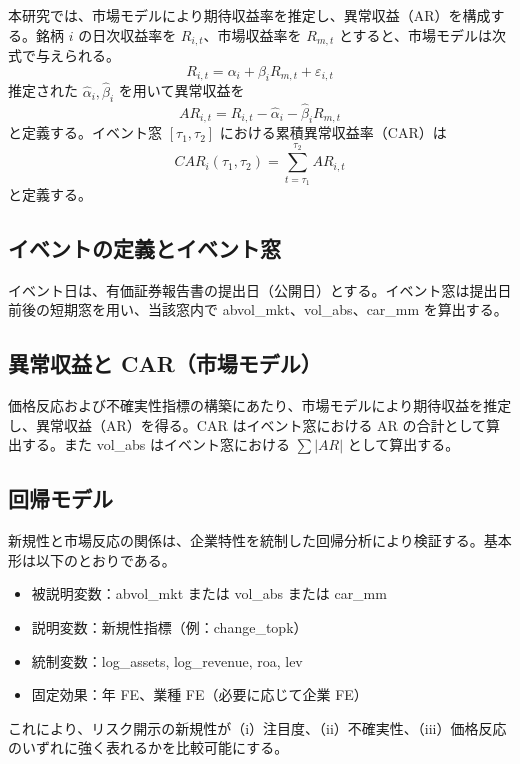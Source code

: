 本研究では、市場モデルにより期待収益率を推定し、異常収益（AR）を構成する。銘柄 \(i\) の日次収益率を \(R_{i,t}\)、市場収益率を \(R_{m,t}\) とすると、市場モデルは次式で与えられる。
\[
R_{i,t}=\alpha_i+\beta_i R_{m,t}+\varepsilon_{i,t}
\]
推定された \(\hat{\alpha}_i,\hat{\beta}_i\) を用いて異常収益を
\[
AR_{i,t}=R_{i,t}-\hat{\alpha}_i-\hat{\beta}_i R_{m,t}
\]
と定義する。イベント窓 \([\tau_1,\tau_2]\) における累積異常収益率（CAR）は
\[
CAR_{i}(\tau_1,\tau_2)=\sum_{t=\tau_1}^{\tau_2} AR_{i,t}
\]
と定義する。

\subsection{イベントの定義とイベント窓}

イベント日は、有価証券報告書の提出日（公開日）とする。イベント窓は提出日前後の短期窓を用い、当該窓内で abvol\_mkt、vol\_abs、car\_mm を算出する。

\subsection{異常収益と CAR（市場モデル）}

価格反応および不確実性指標の構築にあたり、市場モデルにより期待収益を推定し、異常収益（AR）を得る。CAR はイベント窓における AR の合計として算出する。また vol\_abs はイベント窓における \(\sum \lvert AR \rvert\) として算出する。

\subsection{回帰モデル}

新規性と市場反応の関係は、企業特性を統制した回帰分析により検証する。基本形は以下のとおりである。

\begin{itemize}

  \item 被説明変数：abvol\_mkt または vol\_abs または car\_mm

  \item 説明変数：新規性指標（例：change\_topk）

  \item 統制変数：log\_assets, log\_revenue, roa, lev

  \item 固定効果：年 FE、業種 FE（必要に応じて企業 FE）

\end{itemize}

これにより、リスク開示の新規性が（i）注目度、（ii）不確実性、（iii）価格反応のいずれに強く表れるかを比較可能にする。

